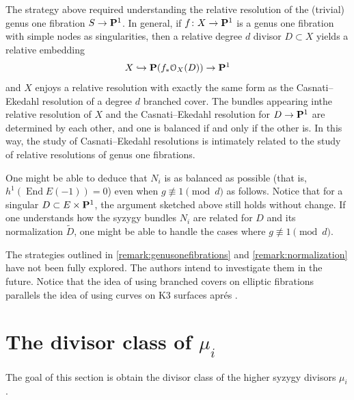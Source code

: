 \documentclass{amsart}
\renewcommand{\O}{{\mathcal O}}
\renewcommand {\P}{{\bf P}}
\providecommand {\from}{{\colon}}
\providecommand{\End}{\operatorname{End}}
\numberwithin{equation}{section}
\begin{document}
  \begin{remark}
  \label{remark:genusonefibrations}
  The strategy above required understanding the relative resolution of the (trivial) genus one fibration $S \to \P^1$.
  In general, if $f \from X \to \P^{1}$ is a genus one fibration with simple nodes as singularities, then a relative degree $d$ divisor $D \subset X$ yields a relative embedding 
  \begin{align*}
    X \hookrightarrow \P(f_{*}\O_{X}(D)) \to \P^{1}
  \end{align*}
  and $X$ enjoys a relative resolution with exactly the same form as the Casnati--Ekedahl resolution of a degree $d$  branched cover.
  The bundles appearing inthe relative resolution of $X$ and the Casnati--Ekedahl resolution for $D \to \P^{1}$ are determined by each other, and one is balanced if and only if the other is.
  In this way, the study of Casnati--Ekedahl resolutions is intimately related to the study of relative resolutions of genus one fibrations.  
\end{remark}

\begin{remark}
  \label{remark:normalization}
  One might be able to deduce that $N_{i}$ is as balanced as possible (that is, $h^1(\End E(-1)) = 0$) even when $g \not \equiv 1 \pmod d$ as follows.
  Notice that for a singular $D \subset E \times \P^{1}$, the argument sketched above still holds without change.
  If one understands how the syzygy bundles $N_{i}$ are related for $D$ and its normalization $\widetilde{D}$, one might be able to handle the cases where $g \not \equiv 1 \pmod d$.  
\end{remark}

The strategies outlined in \autoref{remark:genusonefibrations} and \autoref{remark:normalization} have not been fully explored.
The authors intend to investigate them in the future.
Notice that the idea of using branched covers on elliptic fibrations parallels the idea of using curves on K3 surfaces apr\'es \cite{laz:86}.

\section{The divisor class of $\mu_i$}\label{sec:computation}

The goal of this section is obtain the divisor class of the higher syzygy divisors $\mu_i$.
\end{document}

